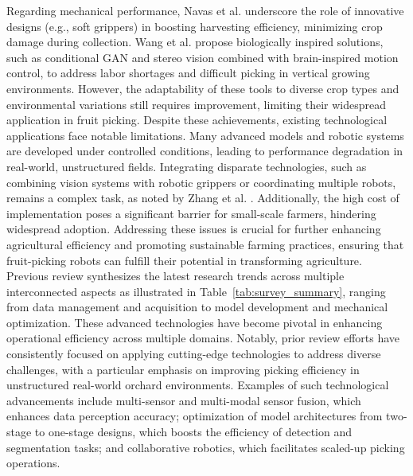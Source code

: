 \documentclass[a4paper,fleqn]{cas-dc}
\begin{document}
Regarding mechanical performance, Navas et al. \cite{navas2021soft} underscore the role of innovative designs (e.g., soft grippers) in boosting harvesting efficiency, minimizing crop damage during collection. Wang et al. \cite{wang2023biologically} propose biologically inspired solutions, such as conditional GAN and stereo vision combined with brain-inspired motion control, to address labor shortages and difficult picking in vertical growing environments. However, the adaptability of these tools to diverse crop types and environmental variations still requires improvement, limiting their widespread application in fruit picking.
Despite these achievements, existing technological applications face notable limitations. Many advanced models and robotic systems are developed under controlled conditions, leading to performance degradation in real-world, unstructured fields. Integrating disparate technologies, such as combining vision systems with robotic grippers or coordinating multiple robots, remains a complex task, as noted by Zhang et al. \cite{zhang2024automatic}. Additionally, the high cost of implementation poses a significant barrier for small-scale farmers, hindering widespread adoption. Addressing these issues is crucial for further enhancing agricultural efficiency and promoting sustainable farming practices, ensuring that fruit-picking robots can fulfill their potential in transforming agriculture.
\fi
\iffalse
Previous review synthesizes the latest research trends across multiple interconnected aspects as illustrated in Table~\ref{tab:survey_summary}, ranging from data management and acquisition to model development and mechanical optimization. These advanced technologies have become pivotal in enhancing operational efficiency across multiple domains. Notably, prior review efforts have consistently focused on applying cutting-edge technologies to address diverse challenges, with a particular emphasis on improving picking efficiency in unstructured real-world orchard environments. Examples of such technological advancements include multi-sensor and multi-modal sensor fusion, which enhances data perception accuracy; optimization of model architectures from two-stage to one-stage designs, which boosts the efficiency of detection and segmentation tasks; and collaborative robotics, which facilitates scaled-up picking operations.
\end{document}
